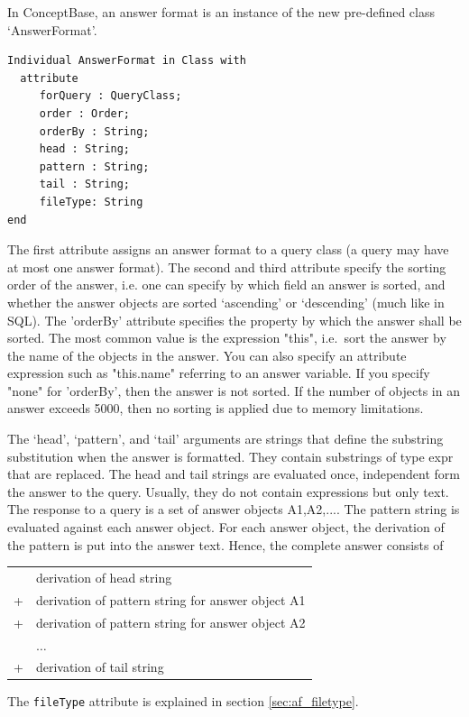 In ConceptBase, an answer format is an instance of the new pre-defined class `AnswerFormat'.

\begin{verbatim}
Individual AnswerFormat in Class with
  attribute
     forQuery : QueryClass;
     order : Order;
     orderBy : String;
     head : String;
     pattern : String;
     tail : String;
     fileType: String
end
\end{verbatim}

The first attribute assigns an answer format to a query class (a query may have at most one answer format). The second and third attribute specify
the sorting order of the answer, i.e. one can specify by which field an answer is sorted, and whether the answer objects are sorted `ascending' or
`descending' (much like in SQL). The 'orderBy' attribute specifies the property by which the answer shall be sorted.
The most common value is the expression "this", i.e.\ sort the answer by the name of the objects in the answer. You can also
specify an attribute expression such as "this.name" referring to an answer variable. If you specify "none" for 'orderBy',
then the answer is not sorted. If the number of objects in an answer exceeds 5000, then no sorting is applied due to
memory limitations.


The `head', `pattern', and `tail' arguments are strings that define the substring substitution when the answer is formatted. They contain substrings of
type {expr} that are replaced. The head and tail strings are evaluated once, independent form the answer to the query. Usually, they do not
contain expressions but only text. The response to a query is a set of answer objects {A1,A2,...}. The pattern string is evaluated against each
answer object. For each answer object, the derivation of the pattern is put into the answer text. Hence, the complete answer consists of

\begin{tabular}{rl}
   &  derivation of head string \\
   + & derivation of pattern string for answer object A1 \\
   + & derivation of pattern string for answer object A2 \\
   &     $\ldots$ \\
   + & derivation of tail string \\
\end{tabular}

The {\tt fileType} attribute is explained in section \ref{sec:af_filetype}.

